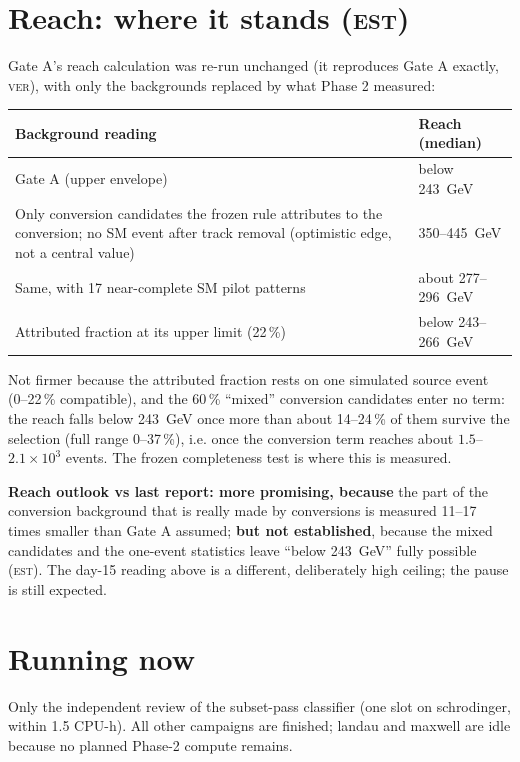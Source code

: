 \documentclass[11pt,a4paper]{article}
\newcommand{\est}{\textsc{est}}
\newcommand{\ver}{\textsc{ver}}
\begin{document}
\section{Reach: where it stands (\est)}
Gate A's reach calculation was re-run unchanged (it reproduces Gate A exactly, \ver), with only the backgrounds
replaced by what Phase 2 measured:
\begin{center}
\begin{tabular}{L{9.0cm}L{5.0cm}}
\toprule
Background reading & Reach (median) \\
\midrule
Gate A (upper envelope) & below 243~GeV \\
Only conversion candidates the frozen rule attributes to the conversion; no SM event after track removal
  (optimistic edge, not a central value) & 350--445~GeV \\
Same, with 17 near-complete SM pilot patterns & about 277--296~GeV \\
Attributed fraction at its upper limit (22\,\%) & below 243--266~GeV \\
\bottomrule
\end{tabular}
\end{center}
Not firmer because the attributed fraction rests on one simulated source event (0--22\,\% compatible), and the
60\,\% ``mixed'' conversion candidates enter no term: the reach falls below 243~GeV once more than about 14--24\,\%
of them survive the selection (full range 0--37\,\%), i.e. once the conversion term reaches about
$1.5$--$2.1\times10^{3}$ events. The frozen completeness test is where this is measured.

\noindent\textbf{Reach outlook vs last report: more promising, because} the part of the conversion background that
is really made by conversions is measured 11--17 times smaller than Gate A assumed; \textbf{but not established},
because the mixed candidates and the one-event statistics leave ``below 243~GeV'' fully possible (\est). The day-15
reading above is a different, deliberately high ceiling; the pause is still expected.

\section{Running now}
Only the independent review of the subset-pass classifier (one slot on schrodinger, within 1.5 CPU-h). All other
campaigns are finished; landau and maxwell are idle because no planned Phase-2 compute remains.
\end{document}
